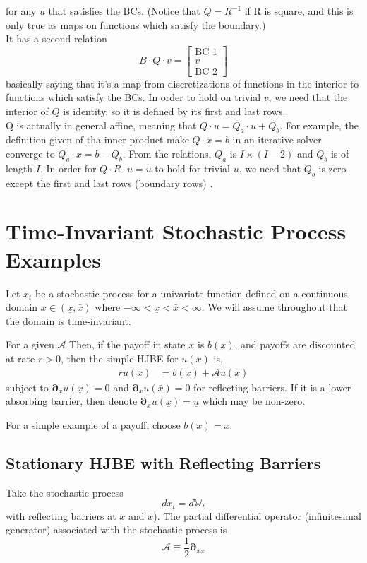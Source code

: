 \documentclass[11pt]{article}
\newcommand{\D}[1][]{\ensuremath{\boldsymbol{\partial}_{#1}}}
\newcommand{\W}{\ensuremath{\mathbb{W}}}
\newcommand{\A}{\ensuremath{\mathcal{A}}}
\begin{document}
\begin{itemize}
for any $u$ that satisfies the BCs. (Notice that $Q = R^{-1}$ if R is square, and this is only true as maps on functions which satisfy the boundary.)\\
It has a second relation 
\begin{equation}
B\cdot Q\cdot v  = \begin{bmatrix}
\text{BC 1}\\
v\\
\text{BC 2}
\end{bmatrix}\label{Q_operator_2}
\end{equation}
basically saying that it's a map from discretizations of functions in the interior to functions which satisfy the BCs. In order to hold on trivial $v$, we need that the interior of $Q$ is identity, so it is defined by its first and last rows.\\
Q is actually in general affine, meaning that $Q\cdot u = Q_a\cdot u+ Q_b$. For example, the definition given of tha inner product make $Q\cdot x=b$ in an iterative solver converge to $Q_a\cdot x = b - Q_b$. From the relations, $Q_a$ is $I\times (I-2)$ and $Q_b$ is of length $I$. In order for $Q\cdot R\cdot u = u$ to hold for trivial $u$, we need that $Q_b$ is zero except the first and last rows (boundary rows) .
\end{itemize}

\section{Time-Invariant Stochastic Process Examples}
Let $x_t$ be a stochastic process for a univariate function defined on a continuous domain $x \in (\underline{x}, \bar{x})$ where $-\infty < \underline{x} < \bar{x} < \infty$.  We will assume throughout that the domain is time-invariant.

For a given $\A$ Then, if the payoff in state $x$ is $b(x)$, and payoffs are discounted at rate $r > 0$, then the simple HJBE for $u(x)$ is,
\begin{align}
r u(x) &= b(x) + \A u(x)\label{eq:general-stationary-HJBE}
\end{align}
subject to $\D[x]u(\underline{x}) = 0$ and $\D[x]u(\bar{x}) = 0$ for reflecting barriers.  If it is a lower absorbing barrier, then denote $\D[x]u(\underline{x}) = \underline{u}$ which may be non-zero.

For a simple example of a payoff, choose $b(x) = x$.

\subsection{Stationary HJBE with Reflecting Barriers}
Take the stochastic process
$$
d x_t = d \W_t
$$
with reflecting barriers at $\underline{x}$ and $\bar{x})$.  The partial differential operator (infinitesimal generator) associated with the stochastic process is
$$
	\A \equiv \frac{1}{2}\D[xx]
$$
\end{document}
